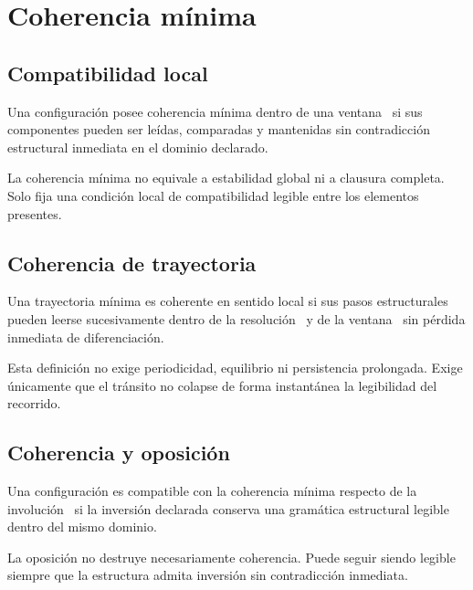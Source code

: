 \chapter{Coherencia mínima}

\section{Compatibilidad local}
\begin{definition}
Una configuración posee coherencia mínima dentro de una ventana \Win\ si sus componentes pueden ser leídas, comparadas y mantenidas sin contradicción estructural inmediata en el dominio declarado.
\end{definition}

\begin{observation}
La coherencia mínima no equivale a estabilidad global ni a clausura completa. Solo fija una condición local de compatibilidad legible entre los elementos presentes.
\end{observation}

\section{Coherencia de trayectoria}
\begin{definition}
Una trayectoria mínima es coherente en sentido local si sus pasos estructurales pueden leerse sucesivamente dentro de la resolución \eps\ y de la ventana \Win\ sin pérdida inmediata de diferenciación.
\end{definition}

\begin{observation}
Esta definición no exige periodicidad, equilibrio ni persistencia prolongada. Exige únicamente que el tránsito no colapse de forma instantánea la legibilidad del recorrido.
\end{observation}

\section{Coherencia y oposición}
\begin{definition}
Una configuración es compatible con la coherencia mínima respecto de la involución \Iop\ si la inversión declarada conserva una gramática estructural legible dentro del mismo dominio.
\end{definition}

\begin{observation}
La oposición no destruye necesariamente coherencia. Puede seguir siendo legible siempre que la estructura admita inversión sin contradicción inmediata.
\end{observation}

